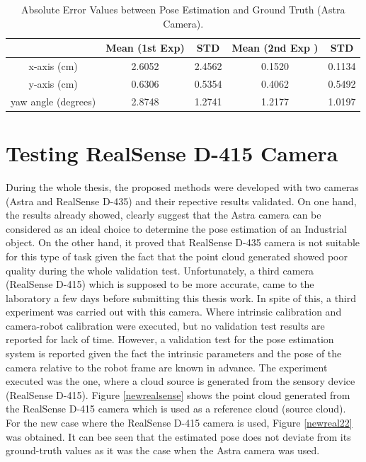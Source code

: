 \begin{table}[ht]
\renewcommand{\arraystretch}{1.3}
\caption{Absolute Error Values between Pose Estimation and Ground Truth (Astra Camera).}
\label{absolute}
\centering
\begin{tabular}{|c|c|c|c|c|}
\hline
  & Mean (1st Exp)& STD &  Mean (2nd Exp )& STD \\
\hline
x-axis (cm) & 2.6052 & 2.4562 & 0.1520 & 0.1134\\
\hline
y-axis (cm) & 0.6306 & 0.5354 & 0.4062 & 0.5492\\
\hline
yaw angle (degrees)& 2.8748 & 1.2741 & 1.2177 & 1.0197\\
\hline
\end{tabular}
\end{table}

\section{Testing RealSense D-415 Camera} \label{thirds}

During the whole thesis, the proposed methods were developed with two cameras (Astra and RealSense D-435) and their repective results validated. On one hand, the results already showed, clearly suggest that the Astra camera can be considered as an ideal choice to determine the pose estimation of an Industrial object. On the other hand, it proved that RealSense D-435 camera is not suitable for this type of task given the fact that the point cloud generated showed poor quality during the whole validation test. Unfortunately, a third camera (RealSense D-415) which is supposed to be more accurate, came to the laboratory a few days before submitting this thesis work. In spite of this, a third experiment was carried out with this camera. Where intrinsic calibration and camera-robot calibration were executed, but no validation test results are reported for lack of time. However, a validation test for the pose estimation system is reported given the fact the intrinsic parameters and the pose of the camera relative to the robot frame are known in advance. The experiment executed was the one, where a cloud source is generated from the sensory device (RealSense D-415). Figure \ref{newrealsense} shows the point cloud generated from the RealSense D-415 camera which is used as a reference cloud (source cloud).\\
For the new case where the RealSense D-415 camera is used, Figure \ref{newreal22} was obtained. It can bee seen that the estimated pose does not deviate from its ground-truth values as it was the case when the Astra camera was used.

